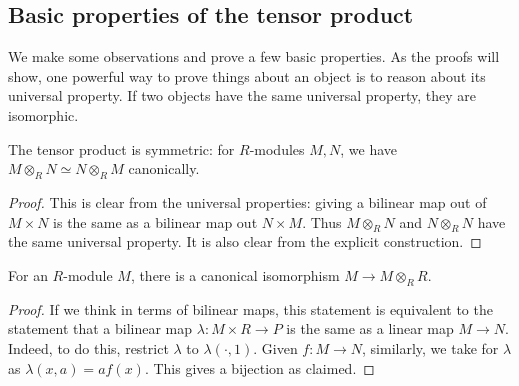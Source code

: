 \subsection{Basic properties of the tensor product}
We make some observations and prove a few basic properties. As the proofs will
show, one powerful way to prove things about an object is to reason about its
universal property. If two objects have the same universal property, they are
isomorphic.

\begin{proposition}
The tensor product is symmetric: for $R$-modules $M,N$, we have $M \otimes_R
N \simeq N \otimes_R M$
canonically.
\end{proposition}
\begin{proof}
This is clear from the universal properties: giving a bilinear map
out of  $M \times N$ is the same as a bilinear map out $N \times M$.
Thus $M \otimes_R N$ and $N \otimes_R N$ have the same universal property.
It is also
clear from the explicit construction.
\end{proof}

\begin{proposition}
For an $R$-module $M$, there is a canonical isomorphism $M \to M \otimes_R R$.
\end{proposition}
\begin{proof}
  If we think in terms of
bilinear maps, this statement is equivalent to the statement that a bilinear
map $\lambda: M \times R \to P$ is the same as a linear map $M \to N$. Indeed,
to do
this, restrict $\lambda$ to $\lambda(\cdot, 1)$.  Given $f: M \to N$,
similarly, we take for $\lambda$ as $\lambda(x,a) = af(x)$. This gives a
bijection as claimed.
\end{proof}

